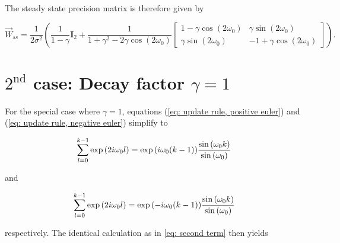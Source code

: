 \documentclass[11pt,a4paper,twoside]{report}
\newcommand{\mat}[1]{\mathbf{#1}}
\begin{document}
\noindent The steady state precision matrix is therefore given by

\begin{equation*}
	\overrightarrow{W}_{ss} = \frac{1}{2\sigma^2}\left(\frac{1}{1-\gamma}\mat{I}_2 + \frac{1}{1+\gamma^2 - 2 \gamma \cos\left( 2\omega_0 \right)}
		\begin{bmatrix}
			1 - \gamma \cos\left( 2\omega_0 \right)&  \gamma \sin\left( 2 \omega_0 \right) \\
			  \gamma \sin\left( 2 \omega_0 \right) &- 1 + \gamma \cos\left( 2\omega_0 \right)
		\end{bmatrix}\right) .
\end{equation*}



\section{ $2^{\text{nd}}$ case:  Decay factor $\gamma = 1$ }

\noindent For the special case where $\gamma = 1$, equations (\ref{eq: update rule, positive euler}) and (\ref{eq: update rule, negative euler}) simplify to

\begin{equation*}
	\label{eq: update rule, geometric series}
	\sum_{l=0}^{k-1}\exp{\left(2i\omega_0l\right)}= \exp{\left(i\omega_0(k-1)\right)}\frac{\sin\left(\omega_0 k\right)}{ \sin\left(\omega_0\right)} \\
\end{equation*}

\noindent and

\begin{equation*}
	\label{eq: update rule, geometric series}
	\sum_{l=0}^{k-1}\exp{\left(2i\omega_0l\right)}= \exp{\left(-i\omega_0(k-1)\right)}\frac{\sin\left(\omega_0 k\right)}{ \sin\left(\omega_0\right)} \\
\end{equation*}

\noindent respectively. The identical calculation as in \ref{eq: second term} then yields
\end{document}
